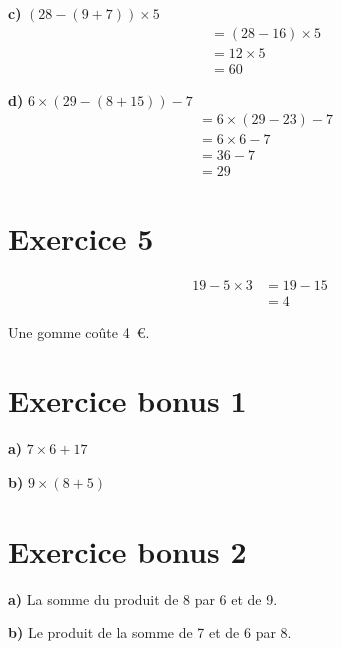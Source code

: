 \documentclass[12pt]{extarticle}
\begin{document}
\textbf{c)} $(28 - (9 + 7)) \times 5$
\begin{align*}
&= (28 - 16) \times 5 \\
&= 12 \times 5 \\
&= 60
\end{align*}

\textbf{d)} $6 \times (29 - (8 + 15)) - 7$
\begin{align*}
&= 6 \times (29 - 23) - 7 \\
&= 6 \times 6 - 7 \\
&= 36 - 7 \\
&= 29
\end{align*}

\section*{Exercice 5}
\begin{align*}
19 - 5 \times 3 &= 19 - 15 \\
                &= 4
\end{align*}

Une gomme coûte 4~€.

\section*{Exercice bonus 1}

\textbf{a)} $7 \times 6 + 17$

\textbf{b)} $9 \times (8 + 5)$

\section*{Exercice bonus 2}

\textbf{a)} La somme du produit de 8 par 6 et de 9.

\textbf{b)} Le produit de la somme de 7 et de 6 par 8.
\end{document}

